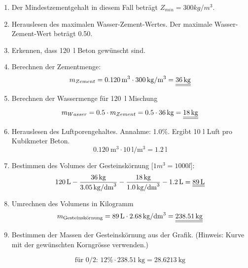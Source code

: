\begin{solution}
\begin{enumerate}
    \item Der Mindestzementgehalt in diesem Fall beträgt $Z_{min} = 300 kg/m^3$.
    \item Herauslesen des maximalen Wasser-Zement-Wertes. Der maximale Wasser-Zement-Wert beträgt 0.50.
    \item Erkennen, dass \SI{120}{\l} Beton gewünscht sind.
    \item Berechnen der Zementmenge:
    \begin{equation*}
        m_{Zement} = \SI{0.120}{\m^3} \cdot \SI{300}{\kg\per\m^3} = \FinRes{\SI{36}{\kg}}
    \end{equation*}
    
    \item Berechnen der Wassermenge für \SI{120}{\l} Mischung
    
    \begin{equation*}
        m_{Wasser} = 0.5 \cdot m_{Zement} = 0.5 \cdot \SI{36}{\kg}  = \FinRes{\SI{18}{\kg}}
    \end{equation*}
    
    \item Herauslesen des Luftporengehaltes. Annahme: 1.0\%. Ergibt 10 l Luft pro Kubikmeter Beton.
    \begin{equation*}
        \SI{0.120}{\m^3} \cdot \SI{10}{\l\per\m^3} = \SI{1.2}{\l}
    \end{equation*}
    \item Bestimmen des Volumes der Gesteinskörnung [$1 m^3 = 1000 l $]:
    \begin{equation*}
        \SI{120}{\l} - \dfrac{\SI{36}{\kg}}{\SI{3.05}{\kg\per\dm^3}} - \dfrac{\SI{18}{\kg}}{\SI{1.0}{\kg\per\dm^3}}-\SI{1.2}{\l} = \FinRes{\SI{89}{\l}}
    \end{equation*}
    
    \item Umrechnen des Volumens in Kilogramm
    \begin{equation*}
        m_{\text{Gesteinskörnung}} = \SI{89}{\l} \cdot \SI{2.68}{\kg\per\dm^3} = \FinRes{\SI{238.51}{\kg}}
    \end{equation*}
    
    
    \item Bestimmen der Massen der Gesteinskörnung aus der Grafik. (Hinweis: Kurve mit der gewünschten Korngrösse verwenden.)
    
    \begin{equation*}
        \text{für 0/2: }   12\% \cdot \SI{238.51}{\kg}  = \SI{28.6213}{\kg}
    \end{equation*}
    

\end{enumerate}
\end{solution}
